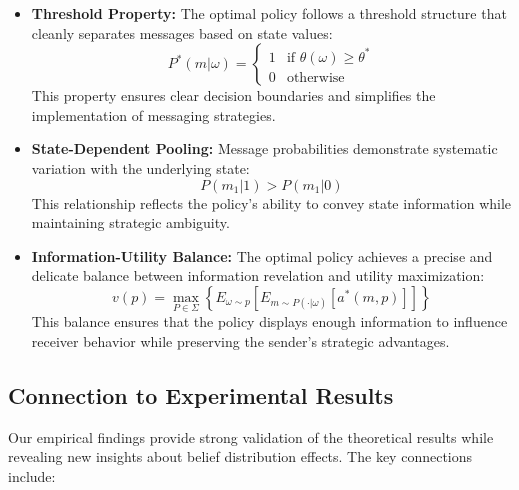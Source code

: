 \documentclass[12pt]{article}
\theoremstyle{plain}
\theoremstyle{definition}
\theoremstyle{remark}
\begin{document}
\begin{itemize}
    \item \textbf{Threshold Property:} The optimal policy follows a threshold structure that cleanly separates messages based on state values:
    \[P^*(m|\omega) = \begin{cases}
        1 & \text{if }\theta(\omega) \geq \theta^*\\
        0 & \text{otherwise}
    \end{cases}\]
    This property ensures clear decision boundaries and simplifies the implementation of messaging strategies.

    \item \textbf{State-Dependent Pooling:} Message probabilities demonstrate systematic variation with the underlying state:
    \[P(m_1|1) > P(m_1|0)\]
    This relationship reflects the policy's ability to convey state information while maintaining strategic ambiguity.

    \item \textbf{Information-Utility Balance:} The optimal policy achieves a precise and delicate balance between information revelation and utility maximization:
    \[v(p) = \max_{P\in\Sigma} \left\{E_{\omega\sim p}\left[E_{m\sim P(\cdot|\omega)}[a^*(m,p)]\right]\right\}\]
    This balance ensures that the policy displays enough information to influence receiver behavior while preserving the sender's strategic advantages.
\end{itemize}

\subsection{Connection to Experimental Results}
Our empirical findings provide strong validation of the theoretical results while revealing new insights about belief distribution effects. The key connections include:
\end{document}
